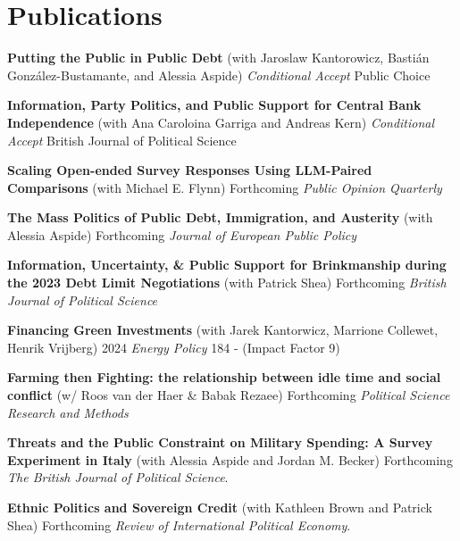 \documentclass[letterpaper]{article}
\begin{document}
\section*{Publications}

\begin{etaremune}

  \item \textbf{Putting the Public in Public Debt} (with Jaroslaw Kantorowicz, Bastián González-Bustamante, and Alessia Aspide) \emph{Conditional Accept} Public Choice

  \item \textbf{Information, Party Politics, and Public Support for Central Bank Independence} (with Ana Caroloina Garriga and Andreas Kern) \emph{Conditional Accept} British Journal of Political Science

    \item \textbf{Scaling Open-ended Survey Responses Using LLM-Paired Comparisons} (with Michael E. Flynn) Forthcoming  \emph{Public Opinion Quarterly}

\item \textbf{The Mass Politics of Public Debt, Immigration, and Austerity} (with Alessia Aspide) Forthcoming \emph{Journal of European Public Policy} 


\item \textbf{Information, Uncertainty, \& Public Support for Brinkmanship during the 2023 Debt Limit Negotiations} (with Patrick Shea) Forthcoming \emph{British Journal of Political Science} 

\item \textbf{Financing Green Investments} (with Jarek Kantorwicz, Marrione Collewet, Henrik Vrijberg) 2024  \emph{Energy Policy} 184 - (Impact Factor 9) 

\item \textbf{Farming then Fighting: the relationship between idle time and social conflict} (w/ Roos van der Haer \& Babak Rezaee) Forthcoming \emph{Political Science Research and Methods} 

\item \textbf{Threats and the Public Constraint on Military Spending: A Survey Experiment in Italy} (with Alessia Aspide and Jordan M. Becker) Forthcoming \emph{The British Journal of Political Science}. 

\item \textbf {Ethnic Politics and Sovereign Credit} (with Kathleen Brown and Patrick Shea) Forthcoming \emph{Review of International Political Economy}. 


\end{etaremune}
\end{document}
